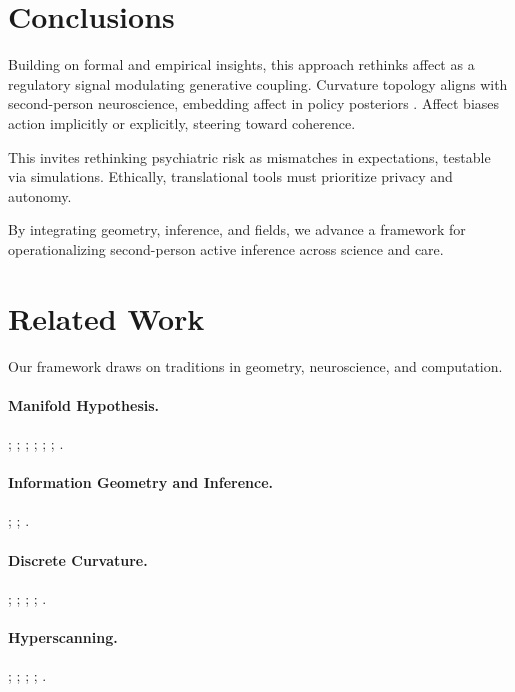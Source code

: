 \documentclass{article}
\theoremstyle{definition}
\begin{document}
\section{Conclusions}

Building on formal and empirical insights, this approach rethinks affect as a regulatory signal modulating generative coupling. Curvature topology aligns with second-person neuroscience, embedding affect in policy posteriors \citep{dacosta2020planning}. Affect biases action implicitly or explicitly, steering toward coherence.

This invites rethinking psychiatric risk as mismatches in expectations, testable via simulations. Ethically, translational tools must prioritize privacy and autonomy.

By integrating geometry, inference, and fields, we advance a framework for operationalizing second-person active inference across science and care.

\section{Related Work}

Our framework draws on traditions in geometry, neuroscience, and computation.

\paragraph{Manifold Hypothesis.} \citet{fefferman2016testing}; \citet{gorban2018blessing}; \citet{olah2014blog}; \citet{cayton2005algorithms}; \citet{chollet2021deep}; \citet{brown2023union}; \citet{lee2023geometric}.

\paragraph{Information Geometry and Inference.} \citet{caticha2015geometry}; \citet{kirchhoff2018markov}; \citet{friston2017graphical}.

\paragraph{Discrete Curvature.} \citet{forman2003bochner}; \citet{ollivier2009ricci}; \citet{samal2018comparative}; \citet{weber2019curvature}; \citet{chatterjee2021detecting}.

\paragraph{Hyperscanning.} \citet{montague2002hyperscanning}; \citet{hakim2023quantification}; \citet{hamilton2021hyperscanning}; \citet{adel2025systematic}; \citet{hinrichs2025hyperscanning,hinrichs2025geometry}.
\end{document}
